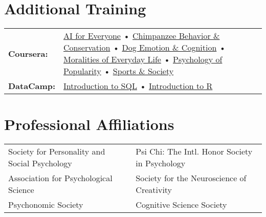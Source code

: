 \documentclass[10pt,a4paper]{cv-nl}
\begin{document}
\section{Additional Training}
\begingroup
\renewcommand{\arraystretch}{1.5} 
\begin{tabular}{p{1in}<{\raggedleft\arraybackslash}p{4.935in}}
\textbf{Coursera:} & 
\href{https://www.coursera.org/account/accomplishments/records/WLJSY4VG226B}{AI for Everyone} • \href{https://www.coursera.org/account/accomplishments/records/SHE877B4D7B2}{Chimpanzee Behavior \& Conservation} • \href{https://www.coursera.org/account/accomplishments/records/23EZD92QU2L9}{Dog Emotion \& Cognition} • \href{https://www.coursera.org/account/accomplishments/records/QZRER729A7ZK}{Moralities of Everyday Life} • \href{https://www.coursera.org/account/accomplishments/records/9QKBTAEYDNX5}{Psychology of Popularity} •
\href{https://www.coursera.org/account/accomplishments/records/EHR9H4ER2K89}{Sports \& Society}
\\
\textbf{DataCamp:} &
\href{https://www.datacamp.com/statement-of-accomplishment/course/5b6540dfb3dfe079f1da48f3ef5a3d06b7ad38e7}{Introduction to SQL} • \href{https://www.datacamp.com/statement-of-accomplishment/course/0d38b7d33d1b87fb3f5a47ad06f9b18f60300038}{Introduction to R} \\
\end{tabular}
\endgroup

\section{Professional Affiliations}
\vspace{2.5pt}

\begingroup
\renewcommand{\arraystretch}{1.5} 
\begin{tabular}{ l l }
Society for Personality and Social Psychology & Psi Chi: The Intl. Honor Society in Psychology \\
Association for Psychological Science & Society for the Neuroscience of Creativity \\
Psychonomic Society & Cognitive Science Society
\end{tabular}
\endgroup
\vspace{10pt}
\end{document}
